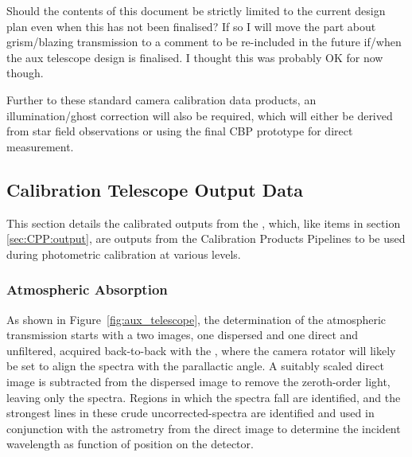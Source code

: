 \begin{itemize}

\end{itemize}

\begin{note}
	Should the contents of this document be strictly limited to the current design plan even when this has not been finalised? If so I will move the part about grism/blazing transmission to a comment to be re-included in the future if/when the aux telescope design is finalised. I thought this was probably OK for now though.
\end{note}

Further to these standard camera calibration data products, an illumination/ghost correction will also be required, which will either be derived from star field observations or using the final CBP prototype for direct measurement.







\subsection{Calibration Telescope Output Data}
\label{sec:CPP:auxTelescope:outputs}
This section details the calibrated outputs from the \auxtelescope, which, like items in section \secsymbol\ref{sec:CPP:output}, are outputs from the Calibration Products Pipelines to be used during photometric calibration at various levels.


\subsubsection{Atmospheric Absorption}\label{sec:CPP:aux:atmosphericAbsorption}
As shown in Figure~\ref{fig:aux_telescope}, the determination of the atmospheric transmission starts with a two images, one dispersed and one direct and unfiltered, acquired back-to-back with the \auxtelescope, where the camera rotator will likely be set to align the spectra with the parallactic angle. A suitably scaled direct image is subtracted from the dispersed image to remove the zeroth-order light, leaving only the spectra. Regions in which the spectra fall are identified, and the strongest lines in these crude uncorrected-spectra are identified and used in conjunction with the astrometry from the direct image to determine the incident wavelength as function of position on the detector.

